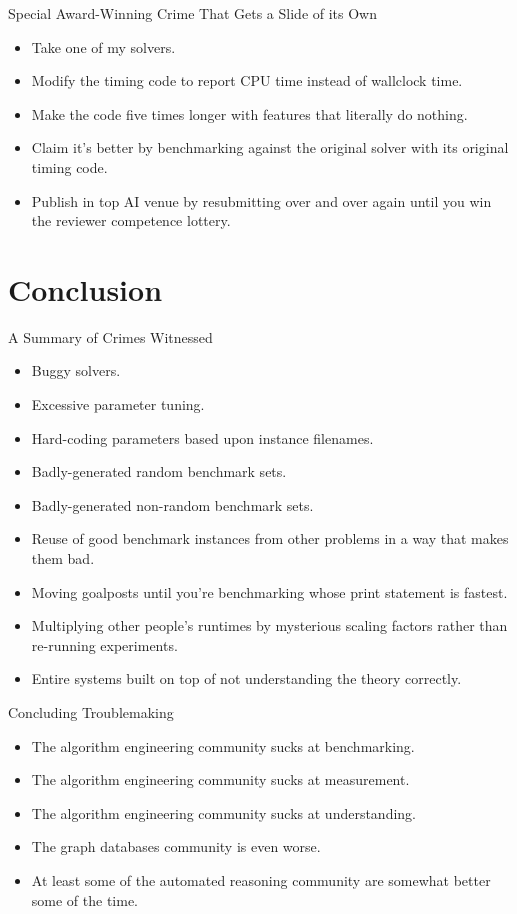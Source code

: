 \documentclass[aspectratio=169,compress,10pt]{beamer}
\begin{document}
\begin{frame}{Special Award-Winning Crime That Gets a Slide of its Own}
    \begin{itemize}
        \item Take one of my solvers.
        \item Modify the timing code to report CPU time instead of wallclock time.
        \item Make the code five times longer with features that literally do nothing.
        \item Claim it's better by benchmarking against the original solver with its original timing
            code.
        \item Publish in top AI venue by resubmitting over and over again until you win the reviewer
            competence lottery.
    \end{itemize}
\end{frame}

\section{Conclusion}

\begin{frame}{A Summary of Crimes Witnessed}
    \begin{itemize}
        \item Buggy solvers.
        \item Excessive parameter tuning.
        \item Hard-coding parameters based upon instance filenames.
        \item Badly-generated random benchmark sets.
        \item Badly-generated non-random benchmark sets.
        \item Reuse of good benchmark instances from other problems in a way that makes them bad.
        \item Moving goalposts until you're benchmarking whose print statement is fastest.
        \item Multiplying other people's runtimes by mysterious scaling factors rather than
            re-running experiments.
        \item Entire systems built on top of not understanding the theory correctly.
    \end{itemize}
\end{frame}

\begin{frame}{Concluding Troublemaking}
    \begin{itemize}
        \item The algorithm engineering community sucks at benchmarking.
        \item The algorithm engineering community sucks at measurement.
        \item The algorithm engineering community sucks at understanding.
        \item The graph databases community is even worse.
        \item At least some of the automated reasoning community are somewhat better some of the
            time.
    \end{itemize}
\end{frame}
\end{document}
